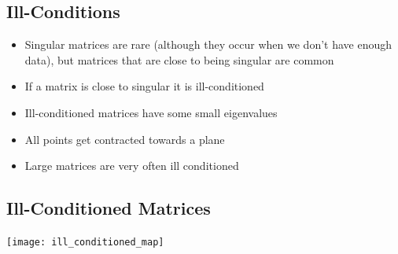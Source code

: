 \documentclass[25pt,landscape,footrule]{foils}
\begin{document}
\begin{slide}
  \section{Ill-Conditions}

  \begin{PauseHighLight}
    \begin{itemize}
    \item Singular matrices are rare (although they occur when we don't
      have enough data), but matrices that are close to
      being singular are common\pause
    \item If a matrix is close to singular it is ill-conditioned\pause
    \item Ill-conditioned matrices have some small eigenvalues\pause
    \item All points get contracted towards a plane\pause
    \item Large matrices are very often ill conditioned\pause
    \end{itemize}
  \end{PauseHighLight}
\end{slide}


\begin{slide}
  \section[-1]{Ill-Conditioned Matrices}

  \begin{PauseHighLight}

    \begin{center}
      \texttt{[image: ill\_conditioned\_map]}
    \end{center}

  \end{PauseHighLight}
\end{slide}

\end{document}

